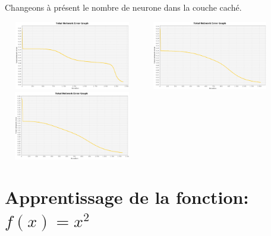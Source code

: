 \documentclass[twoside,openright,a4paper,11pt,french]{article}
\begin{document}
Changeons à présent le nombre de neurone dans la couche caché.


\includegraphics[width=6cm,height=3cm]{./pics/eq/multi-5_eq_def.eps}
\includegraphics[width=6cm,height=3cm]{./pics/eq/multi-10_eq_def.eps}
\includegraphics[width=6cm,height=3cm]{./pics/eq/multi-20_eq_def.eps}

\section{Apprentissage de la fonction: $f(x) = x^2$}
\end{document}
